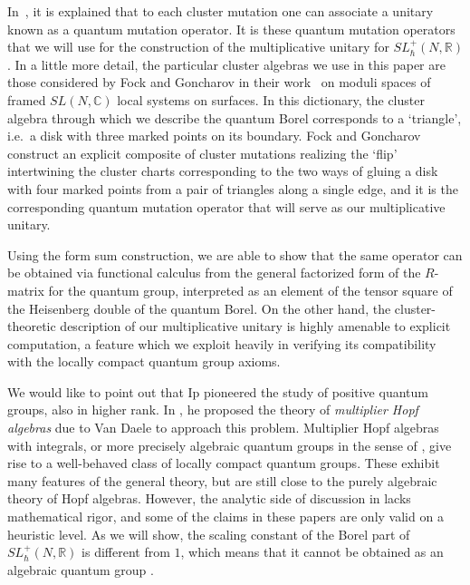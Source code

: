 \documentclass[11pt, reqno]{amsart}
\theoremstyle{definition}
\numberwithin{equation}{section}
\begin{document}
In~\cite{FG09}, it is explained that to each cluster mutation one can associate a unitary known as a quantum  mutation operator. It is these quantum mutation operators that we will use for the construction of the multiplicative unitary for $SL^+_\hbar(N,\mathbb{R})$. In a little more detail, the particular cluster algebras we use in this paper are those considered by Fock and Goncharov in their work~\cite{FG06} on moduli spaces of framed $SL(N,\mathbb{C})$ local systems on surfaces. In this dictionary, the cluster algebra through which we describe the quantum Borel corresponds to a `triangle', i.e.\ a disk with three marked points on its boundary.  Fock and Goncharov construct an explicit composite of cluster mutations realizing the `flip' intertwining the cluster charts corresponding to the two ways of gluing a disk with four marked points from a pair of triangles along a single edge, and it is the corresponding quantum mutation operator that will serve as our multiplicative unitary. 

Using the form sum construction, we are able to show that the same operator can be obtained via functional calculus from the general factorized form of the $R$-matrix for the quantum group, interpreted as an element of the tensor square of the Heisenberg double of the quantum Borel. On the other hand, the cluster-theoretic description of our multiplicative unitary is highly amenable to explicit computation, a feature which we exploit heavily in verifying its compatibility with the locally compact quantum group axioms. 

We would like to point out that Ip pioneered the study of positive quantum groups, also in higher rank. In \cite{Ip12,Ip13,Ip17}, he proposed the theory of \emph{multiplier Hopf algebras} due to Van Daele \cite{VD98} to approach this problem. Multiplier Hopf algebras with integrals, or more precisely algebraic quantum groups in the sense of \cite{KVD97}, give rise to a well-behaved class of locally compact quantum groups. These exhibit many features of the general theory, but are still close to the purely algebraic theory of Hopf algebras. However, the analytic side of discussion in \cite{Ip12,Ip13,Ip17} lacks mathematical rigor, and some of the claims in these papers are only valid on a heuristic level. As we will show, the scaling constant of the Borel part of $ SL^+_\hbar(N, \mathbb{R}) $ is different from $ 1 $, which means that it cannot be obtained as an algebraic quantum group \cite{DCVD10}. 
\end{document}
